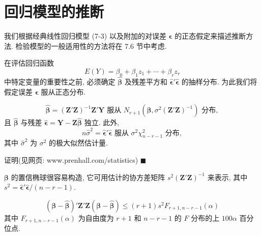
\section{回归模型的推断}
\label{sec:7.4}

我们根据经典线性回归模型 (7-3) 以及附加的对误差 $\boldsymbol{\epsilon}$ 的正态假定来描述推断方法. 检验模型的一般适用性的方法将在 7.6 节中考虑.


在评估回归函数
\label{eq:7-10}
\begin{equation}
E(Y)=\beta_0+\beta_1 z_1+\cdots+\beta_r z_r
\tag{7-10}
\end{equation}
中特定变量的重要性之前, 必须确定 $\hat{\boldsymbol{\beta}}$ 及残差平方和 $\hat{\boldsymbol{\epsilon}}'\hat{\boldsymbol{\epsilon}}$ 的抽样分布. 为此我们将假定误差 $\boldsymbol{\epsilon}$ 服从正态分布.

\[
\hat{\boldsymbol{\beta}}=(\mathbf{Z}'\mathbf{Z})^{-1}\mathbf{Z}'\mathbf{Y}\text{ 服从 }N_{r+1}(\boldsymbol{\beta},\sigma^2(\mathbf{Z}'\mathbf{Z})^{-1})\text{ 分布},
\]
且 $\hat{\boldsymbol{\beta}}$ 与残差 $\hat{\boldsymbol{\epsilon}}=\mathbf{Y}-\mathbf{Z}\hat{\boldsymbol{\beta}}$ 独立. 此外,
\[
n\hat{\sigma}^2=\hat{\boldsymbol{\epsilon}}'\hat{\boldsymbol{\epsilon}}\text{ 服从 }\sigma^2\chi_{n-r-1}^2\text{ 分布},
\]
其中 $\hat{\sigma}^2$ 为 $\sigma^2$ 的极大似然估计量.

证明\quad (见网页: www.prenhall.com/statistics) \hfill$\blacksquare$

$\boldsymbol{\beta}$ 的置信椭球很容易构造, 它可用估计的协方差矩阵 $s^2(\mathbf{Z}'\mathbf{Z})^{-1}$ 来表示, 其中 $s^2=\hat{\boldsymbol{\epsilon}}'\hat{\boldsymbol{\epsilon}}/(n-r-1)$.

\[
(\boldsymbol{\beta}-\hat{\boldsymbol{\beta}})'\mathbf{Z}'\mathbf{Z}(\boldsymbol{\beta}-\hat{\boldsymbol{\beta}})\leq (r+1)s^2 F_{r+1,n-r-1}(\alpha)
\]
其中 $F_{r+1,n-r-1}(\alpha)$ 为自由度为 $r+1$ 和 $n-r-1$ 的 $F$ 分布的上 $100\alpha$ 百分位点.

